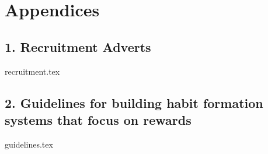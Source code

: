 \cleardoublepage

\section*{Appendices}

\subsection*{1. Recruitment Adverts} \label{app:recruitment}
{recruitment.tex}

\newpage
\begin{landscape}
\subsection*{2. Guidelines for building habit formation systems that focus on rewards}  \label{app:guidelines}
  {guidelines.tex}
\end{landscape}

\newpage
